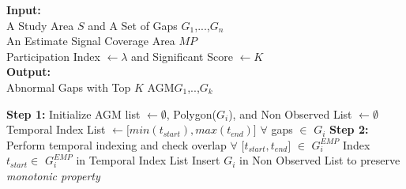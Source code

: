 \documentclass[acmsmall]{acmart}
\begin{document}

\begin{algorithm}
\caption{Space-Time Aware Indexing Algorithm}
\label{STAGD}
\footnotesize
\begin{flushleft}
\hspace*{\algorithmicindent}\textbf{Input:}\\
\hspace*{\algorithmicindent} A Study Area $S$ and A Set of Gaps \lbrack$G_{1}$,...,$G_{n}$\rbrack\\
\hspace*{\algorithmicindent} An Estimate Signal Coverage Area $MP$\\
\hspace*{\algorithmicindent} Participation Index $\leftarrow \lambda$ and Significant Score $\leftarrow K$\\
\hspace*{\algorithmicindent}\textbf{Output:}\\
\hspace*{\algorithmicindent} Abnormal Gaps with Top $K$ AGM\lbrack$G_{1}$,..,$G_{k}$\rbrack
\footnotesize
\end{flushleft}
\begin{algorithmic}[1]
    \Procedure{:}{}
    \State \textbf{Step 1:} Initialize AGM list $\leftarrow \emptyset$, Polygon($G_{i}$), and Non Observed List $\leftarrow \emptyset$
    \State Temporal Index List $\leftarrow \lbrack min(t_{start}),max(t_{end}) \rbrack$ $\forall$ gaps $\in$ $G_{i}$
    \State \textbf{Step 2:} Perform temporal indexing and check overlap $\forall$ $\lbrack t_{start},t_{end} \rbrack$ $\in$ $G_{i}^{EMP}$
    \State Index $t_{start} \in $ $G_{i}^{EMP}$ in Temporal Index List
    \State Insert $G_{i}$ in Non Observed List to preserve \textit{monotonic property}

\end{algorithmic}
\end{algorithm}
\end{document}
